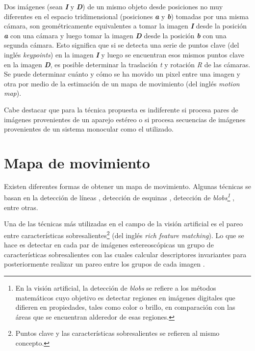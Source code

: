 Dos im\'{a}genes (sean \textit{\textbf{I}} y \textit{\textbf{D}}) de un mismo objeto desde posiciones no muy diferentes en el espacio tridimensional (posiciones \textit{\textbf{a}} y \textit{\textbf{b}}) tomadas por una misma c\'{a}mara, son geom\'{e}tricamente equivalentes a tomar la imagen \textit{\textbf{I}} desde la posici\'{o}n \textit{\textbf{a}} con una c\'{a}mara y luego tomar la imagen \textit{\textbf{D}} desde la posici\'{o}n \textit{\textbf{b}} con una segunda c\'{a}mara. Esto significa que si se detecta una serie de puntos clave (del ingl\'{e}s \textit{keypoints}) en la imagen \textit{\textbf{I}} y luego se encuentran esos mismos puntos clave en la imagen \textit{\textbf{D}}, es posible determinar la traslaci\'{o}n \textit{t} y rotaci\'{o}n \textit{R} de las c\'{a}maras. Se puede determinar cu\'{a}nto y c\'{o}mo se ha movido un pixel entre una imagen y otra por medio de la estimaci\'{o}n de un mapa de movimiento (del ingl\'{e}s \textit{motion map}).

Cabe destacar que para la t\'{e}cnica propuesta es indiferente si procesa pares de im\'{a}genes provenientes de un aparejo est\'{e}reo o si procesa secuencias de im\'{a}genes provenientes de un sistema monocular como el utilizado.


\section{Mapa de movimiento}
Existen diferentes formas de obtener un mapa de movimiento. Algunas t\'{e}cnicas se basan en la detecci\'{o}n de l\'{i}neas \cite{Ding_Goshtasby_2001}, detecci\'{o}n de esquinas \cite{Harris_Stephens_1988}, detecci\'{o}n de \textit{blobs\footnote{En la visi\'{o}n artificial, la detecci\'{o}n de \textit{blobs} se refiere a los m\'{e}todos matem\'{a}ticos cuyo objetivo es detectar regiones en im\'{a}genes digitales que difieren en propiedades, tales como color o brillo, en comparaci\'{o}n con las \'{a}reas que se encuentran alderedor de esas regiones.}} \cite{Ming_Huadong_2007}, entre otras. 

Una de las t\'{e}cnicas m\'{a}s utilizadas en el campo de la visi\'{o}n artificial es el pareo entre caracter\'{i}sticas sobresalientes\footnote{Puntos clave y las caracter\'{i}sticas sobresalientes se refieren al mismo concepto.} (del ingl\'{e}s \textit{rich feature matching}). Lo que se hace es detectar en cada par de im\'{a}genes estereosc\'{o}picas un grupo de caracter\'{i}sticas sobresalientes con las cuales calcular descriptores invariantes para posteriormente realizar un pareo entre los grupos de cada imagen \cite{Shapiro_Stockman_2001,Szeliski_2010,Cyganek_Siebert_2009}.

